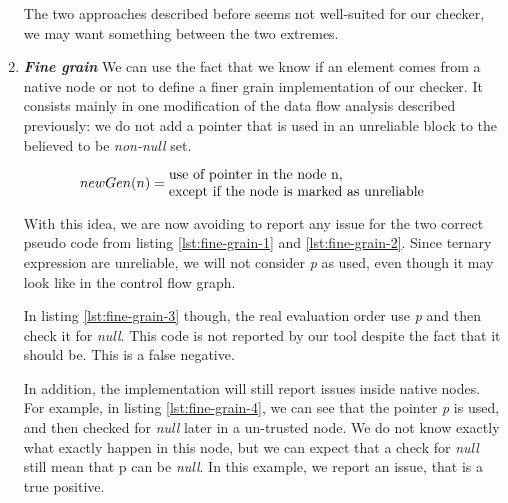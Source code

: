 \begin{enumerate}
The two approaches described before seems not well-suited for our checker, we may want something between the two extremes.

\item \textbf{\textit{Fine grain}} \newline
We can use the fact that we know if an element comes from a native node or not to define a finer grain implementation of our checker. 
It consists mainly in one modification of the data flow analysis described previously: we do not add a pointer that is used in an unreliable block to the believed to be \emph{non-null} set.

\begin{equation}\label{eqn:new_dataflow4}
newGen(n) = \parbox{7cm}{use of pointer in the node n, \newline except if the node is marked as unreliable}
\end{equation}





With this idea, we are now avoiding to report any issue for the two correct pseudo code from listing \ref{lst:fine-grain-1} and \ref{lst:fine-grain-2}. Since ternary expression are unreliable, we will not consider \emph{p} as used, even though it may look like in the control flow graph.



In listing \ref{lst:fine-grain-3} though, the real evaluation order use \emph{p} and then check it for \emph{null}. 
This code is not reported by our tool despite the fact that it should be. This is a false negative.\newline



In addition, the implementation will still report issues inside native nodes.
For example, in listing \ref{lst:fine-grain-4}, we can see that the pointer \emph{p} is used, and then checked for \emph{null} later in a un-trusted node. We do not know exactly what exactly happen in this node, but we can expect that a check for \emph{null} still mean that p can be \emph{null}. 
In this example, we report an issue, that is a true positive.
\end{enumerate}

